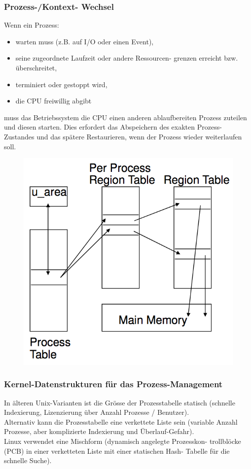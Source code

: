 \documentclass[a4paper, 10pt]{article}
\begin{document}
\subsubsection{Prozess-/Kontext- Wechsel}
Wenn ein Prozess:
\begin{itemize}
	\item warten muss (z.B. auf I/O oder einen Event),
	\item seine zugeordnete Laufzeit oder andere Ressourcen- grenzen erreicht bzw. überschreitet,
	\item terminiert oder gestoppt wird,
	\item die CPU freiwillig abgibt
\end{itemize}
muss das Betriebssystem die CPU einen anderen ablaufbereiten Prozess zuteilen und diesen starten. Dies erfordert das Abspeichern des exakten Prozess- Zustandes und das spätere Restaurieren, wenn der Prozess wieder weiterlaufen soll.\\

\begin{figure}
\includegraphics[scale=0.2]{process_region_table.png}
\end{figure}

\subsubsection{Kernel-Datenstrukturen für das Prozess-Management}
In älteren Unix-Varianten ist die Grösse der Prozesstabelle statisch (schnelle Indexierung, Lizenzierung über Anzahl Prozesse / Benutzer).\\
Alternativ kann die Prozesstabelle eine verkettete Liste sein (variable Anzahl Prozesse, aber komplizierte Indexierung und Überlauf-Gefahr). \\
Linux verwendet eine Mischform (dynamisch angelegte Prozesskon- trollblöcke (PCB) in einer verketteten Liste mit einer statischen Hash- Tabelle für die schnelle Suche).
\end{document}

